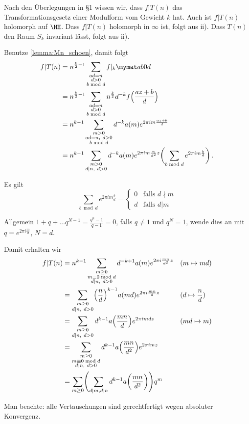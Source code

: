 \begin{bewe-list}
\item Nach den Überlegungen in §1 wissen wir, dass $f | T(n)$ das Transformationsgesetz einer Modulform vom Gewicht $k$ hat. Auch ist $f | T(n)$ holomorph auf $\HH$. Dass $f | T(n)$ holomorph in $\infty$ ist, folgt aus ii). Dass $T(n)$ den Raum $S_k$ invariant lässt, folgt aus ii).

\item Benutze \autoref{lemma:Mn_schoen}, damit folgt
\begin{align*}
	f|T(n)
	&= n^{\frac{k}{2}-1} \sum_{\substack{ad=n\\ d>0 \\ b\bmod d}} f|_k \mymat ab0d \\
	&= n^{\frac{k}{2}-1} \sum_{\substack{ad=n\\ d>0 \\ b\bmod d}} n^{\frac{k}{2}} d^{-k} f\Bigl(\frac{az+b}{d}\Bigr) \\
	&= n^{k-1} \sum_{\substack{m>0\\ ad=n,\ d>0\\ b\bmod d}} d^{-k} a(m) e^{2\pi im \frac{az+b}{d}} \\
	&= n^{k-1} \sum_{\substack{m>0\\ d|n,\ d>0}} d^{-k} a(m) e^{2\pi im \frac{n}{d^2}z} \biggl( \sum_{b\bmod d} e^{2\pi im \frac{b}{d}}\biggr)
	\,.
\end{align*}

Es gilt
\[
	\sum_{b \bmod d} e^{2\pi im \frac{b}{d}}
	= \begin{cases}
		0 & \text{falls } d\nmid m \\
		d & \text{falls } d| m
	  \end{cases}
\]

Allgemein $1+q+\ldots q^{N-1} = \frac{q^n-1}{q-1} = 0$, falls $q\not=1$ und $q^N = 1$, wende dies an mit $q=e^{2\pi i \frac{m}{d}}$, $N=d$.

Damit erhalten wir
\begin{align*}
	f|T(n)
	&= n^{k-1} \sum_{\substack{m \geq 0 \\ m \equiv 0 \bmod d \\ d|n,\ d > 0}} d^{-k+1} a(m) e^{2\pi i\frac{mn}{d^2}z} &&(m\mapsto md) \\
	&= \sum_{\substack{m \geq 0\\ d|n,\ d>0}} \Bigl(\frac{n}{d}\Bigr)^{k-1} a(md) e^{2\pi i \frac{mn}{d}z} &&(d\mapsto\frac{n}{d}) \\
	&= \sum_{\substack{m \geq 0 \\ d|n,\ d>0}} d^{k-1} a\Bigl(\frac{mn}{d}\Bigr) e^{2\pi imdz} && (md\mapsto m) \\
	&= \sum_{\substack{m\geq 0 \\ m\equiv 0 \bmod d \\ d|n,\ d>0}} d^{k-1} a\Bigl(\frac{mn}{d^2}\Bigr) e^{2\pi imz} \\
	&= \sum_{m\geq 0} \Biggl(\sum_{d|m, d|n} d^{k-1} a\biggl(\frac{mn}{d^2}\biggr)\Biggr) q^m
\end{align*}

Man beachte: alle Vertauschungen sind gerechtfertigt wegen absoluter Konvergenz.
\end{bewe-list}

